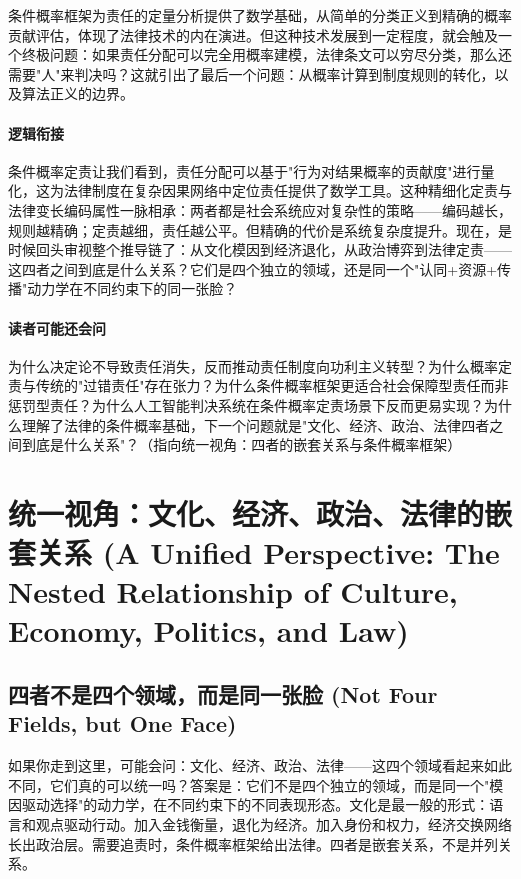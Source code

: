 \documentclass[../main.tex]{subfiles}
\begin{document}
	条件概率框架为责任的定量分析提供了数学基础，从简单的分类正义到精确的概率贡献评估，体现了法律技术的内在演进。但这种技术发展到一定程度，就会触及一个终极问题：如果责任分配可以完全用概率建模，法律条文可以穷尽分类，那么还需要"人"来判决吗？这就引出了最后一个问题：从概率计算到制度规则的转化，以及算法正义的边界。
	
	\paragraph*{逻辑衔接}

	条件概率定责让我们看到，责任分配可以基于"行为对结果概率的贡献度"进行量化，这为法律制度在复杂因果网络中定位责任提供了数学工具。这种精细化定责与法律变长编码属性一脉相承：两者都是社会系统应对复杂性的策略——编码越长，规则越精确；定责越细，责任越公平。但精确的代价是系统复杂度提升。现在，是时候回头审视整个推导链了：从文化模因到经济退化，从政治博弈到法律定责——这四者之间到底是什么关系？它们是四个独立的领域，还是同一个"认同+资源+传播"动力学在不同约束下的同一张脸？
	
	\paragraph*{读者可能还会问}

	为什么决定论不导致责任消失，反而推动责任制度向功利主义转型？为什么概率定责与传统的"过错责任"存在张力？为什么条件概率框架更适合社会保障型责任而非惩罚型责任？为什么人工智能判决系统在条件概率定责场景下反而更易实现？为什么理解了法律的条件概率基础，下一个问题就是"文化、经济、政治、法律四者之间到底是什么关系"？（指向统一视角：四者的嵌套关系与条件概率框架）


	\section{统一视角：文化、经济、政治、法律的嵌套关系 (A Unified Perspective: The Nested Relationship of Culture, Economy, Politics, and Law)}

	\subsection{四者不是四个领域，而是同一张脸 (Not Four Fields, but One Face)}

	\begin{motivation}

		如果你走到这里，可能会问：文化、经济、政治、法律——这四个领域看起来如此不同，它们真的可以统一吗？答案是：它们不是四个独立的领域，而是同一个"模因驱动选择"的动力学，在不同约束下的不同表现形态。文化是最一般的形式：语言和观点驱动行动。加入金钱衡量，退化为经济。加入身份和权力，经济交换网络长出政治层。需要追责时，条件概率框架给出法律。四者是嵌套关系，不是并列关系。

	\end{motivation}
\end{document}
